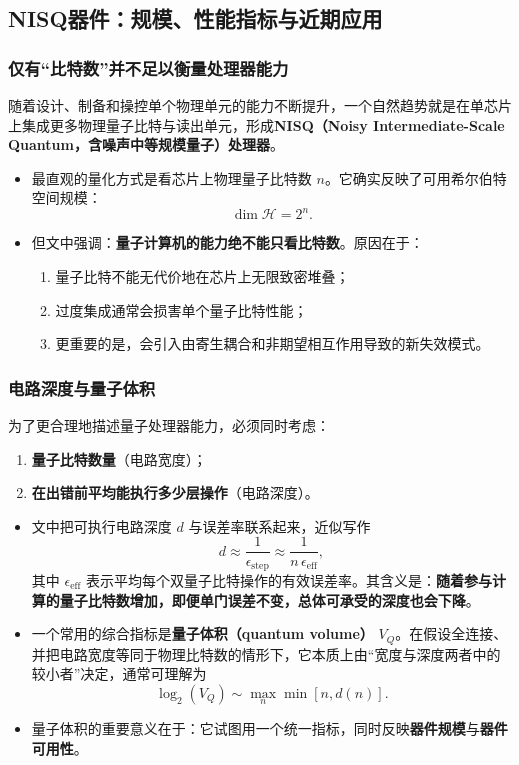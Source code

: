 \documentclass[12pt,a4paper,oneside]{ctexbook}
\begin{document}
\subsection{NISQ器件：规模、性能指标与近期应用}

\subsubsection{仅有“比特数”并不足以衡量处理器能力}

随着设计、制备和操控单个物理单元的能力不断提升，一个自然趋势就是在单芯片上集成更多物理量子比特与读出单元，形成\textbf{NISQ（Noisy Intermediate-Scale Quantum，含噪声中等规模量子）处理器}。

\begin{itemize}
    \item 最直观的量化方式是看芯片上物理量子比特数 \(n\)。它确实反映了可用希尔伯特空间规模：
    \[
    \dim \mathcal{H} = 2^n.
    \]
    
    \item 但文中强调：\textbf{量子计算机的能力绝不能只看比特数}。原因在于：
    \begin{enumerate}
        \item 量子比特不能无代价地在芯片上无限致密堆叠；
        \item 过度集成通常会损害单个量子比特性能；
        \item 更重要的是，会引入由寄生耦合和非期望相互作用导致的新失效模式。
    \end{enumerate}
\end{itemize}

\subsubsection{电路深度与量子体积}

为了更合理地描述量子处理器能力，必须同时考虑：

\begin{enumerate}
    \item \textbf{量子比特数量}（电路宽度）；
    \item \textbf{在出错前平均能执行多少层操作}（电路深度）。
\end{enumerate}

\begin{itemize}
    \item 文中把可执行电路深度 \(d\) 与误差率联系起来，近似写作
    \[
    d \approx \frac{1}{\epsilon_{\mathrm{step}}}
    \approx \frac{1}{n\,\epsilon_{\mathrm{eff}}},
    \]
    其中 \(\epsilon_{\mathrm{eff}}\) 表示平均每个双量子比特操作的有效误差率。其含义是：\textbf{随着参与计算的量子比特数增加，即便单门误差不变，总体可承受的深度也会下降}。
    
    \item 一个常用的综合指标是\textbf{量子体积（quantum volume）} \(V_Q\)。在假设全连接、并把电路宽度等同于物理比特数的情形下，它本质上由“宽度与深度两者中的较小者”决定，通常可理解为
    \[
    \log_2(V_Q)\sim \max_n \min[n,d(n)].
    \]
    
    \item 量子体积的重要意义在于：它试图用一个统一指标，同时反映\textbf{器件规模}与\textbf{器件可用性}。
\end{itemize}
\end{document}
